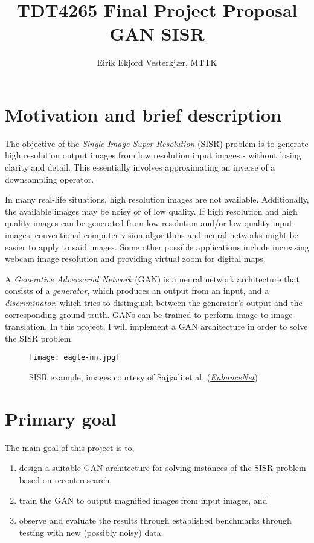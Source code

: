 \documentclass{article}
\title{TDT4265 Final Project Proposal \\ GAN SISR}
\author{Eirik Ekjord Vesterkjær, MTTK}
\date{}
\begin{document}
\maketitle

\section{Motivation and brief description}

The objective of the \textit{Single Image Super Resolution} (SISR) problem is to generate high resolution output images from low resolution input images - without losing clarity and detail. This essentially involves approximating an inverse of a downsampling operator. 


In many real-life situations, high resolution images are not available. Additionally, the available images may be noisy or of low quality. If high resolution and high quality images can be generated from low resolution and/or low quality input images, conventional computer vision algorithms and neural networks might be easier to apply to said images. Some other possible applications include increasing webcam image resolution and providing virtual zoom for digital maps.

A \textit{Generative Adversarial Network} (GAN) is a neural network architecture that consists of a \textit{generator}, which produces an output from an input, and a \textit{discriminator}, which tries to distinguish between the generator's output and the corresponding ground truth. GANs can be trained to perform image to image translation. In this project, I will implement a GAN architecture in order to solve the SISR problem.

\begin{figure}[h!]
    \centering
    \texttt{[image: eagle-nn.jpg]}
    \caption{SISR example, images courtesy of Sajjadi et al. (\href{http://webdav.tuebingen.mpg.de/pixel/enhancenet/}{\textit{EnhanceNet}})}
\end{figure}



\section{Primary goal}

The main goal of this project is to,


\begin{enumerate}
    \item design a suitable GAN architecture for solving instances of the SISR problem based on recent research,
    \item train the GAN to output magnified images from input images, and
    \item observe and evaluate the results through established benchmarks through testing with new (possibly noisy) data.
\end{enumerate}
\end{document}
